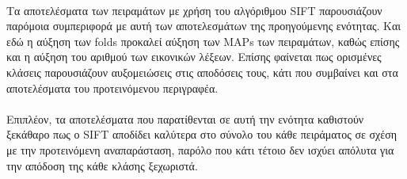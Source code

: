 \FloatBarrier
\newpage
\paragraph*{}
Τα αποτελέσματα των πειραμάτων με χρήση του αλγόριθμου SIFT παρουσιάζουν παρόμοια συμπεριφορά με αυτή των αποτελεσμάτων της προηγούμενης ενότητας. Και εδώ η αύξηση των folds προκαλεί αύξηση των MAPs των πειραμάτων, καθώς επίσης και η αύξηση του αριθμού των εικονικών λέξεων. Επίσης φαίνεται πως ορισμένες κλάσεις παρουσιάζουν αυξομειώσεις στις αποδόσεις τους, κάτι που συμβαίνει και στα αποτελέσματα του προτεινόμενου περιγραφέα.

\paragraph*{}
Επιπλέον, τα αποτελέσματα που παρατίθενται σε αυτή την ενότητα καθιστούν ξεκάθαρο πως ο SIFT αποδίδει καλύτερα στο σύνολο του κάθε πειράματος σε σχέση με την προτεινόμενη αναπαράσταση, παρόλο που κάτι τέτοιο δεν ισχύει απόλυτα για την απόδοση της κάθε κλάσης ξεχωριστά.